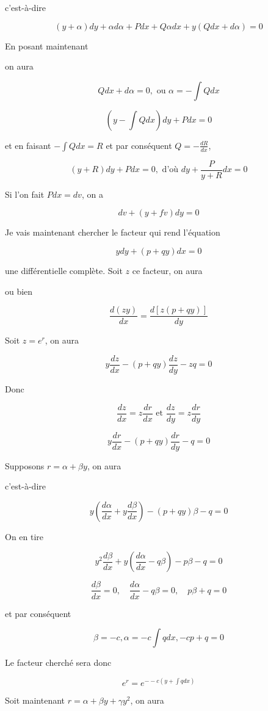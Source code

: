 \documentclass{article}
\begin{document}
c'est-à-dire

\[
(y+\alpha) d y+\alpha d \alpha+P d x+Q \alpha d x+y(Q d x+d \alpha)=0
\]

En posant maintenant

on aura

\[
Q d x+d \alpha=0, \text { ou } \alpha=-\int Q d x
\]

\[
\left(y-\int Q d x\right) d y+P d x=0
\]

et en faisant \(-\int Q d x=R\) et par conséquent \(Q=-\frac{d R}{d x}\),

\[
(y+R) d y+P d x=0, \text { d'où } d y+\frac{P}{y+R} d x=0
\]

Si l'on fait \(P d x=d v\), on a

\[
d v+(y+f v) d y=0
\]

Je vais maintenant chercher le facteur qui rend l'équation

\[
y d y+(p+q y) d x=0
\]

une différentielle complète. Soit \(z\) ce facteur, on aura

ou bien

\[
\frac{d(z y)}{d x}=\frac{d[z(p+q y)]}{d y}
\]

Soit \(z=e^{r}\), on aura

\[
y \frac{d z}{d x}-(p+q y) \frac{d z}{d y}-z q=0
\]

Donc

\[
\frac{d z}{d x}=z \frac{d r}{d x} \text { et } \frac{d z}{d y}=z \frac{d r}{d y}
\]

\[
y \frac{d r}{d x}-(p+q y) \frac{d r}{d y}-q=0
\]

Supposons \(r=\alpha+\beta y\), on aura

c'est-à-dire

\[
y\left(\frac{d \alpha}{d x}+y \frac{d \beta}{d x}\right)-(p+q y) \beta-q=0
\]

On en tire

\[
y^{2} \frac{d \beta}{d x}+y\left(\frac{d \alpha}{d x}-q \beta\right)-p \beta-q=0
\]

\[
\frac{d \beta}{d x}=0, \quad \frac{d \alpha}{d x}-q \beta=0, \quad p \beta+q=0
\]

et par conséquent

\[
\beta=-c, \alpha=-c \int q d x,-c p+q=0
\]

Le facteur cherché sera donc

\[
e^{r}=e^{--c\left(y+\int q d x\right)}
\]

Soit maintenant \(r=\alpha+\beta y+\gamma y^{2}\), on aura
\end{document}

